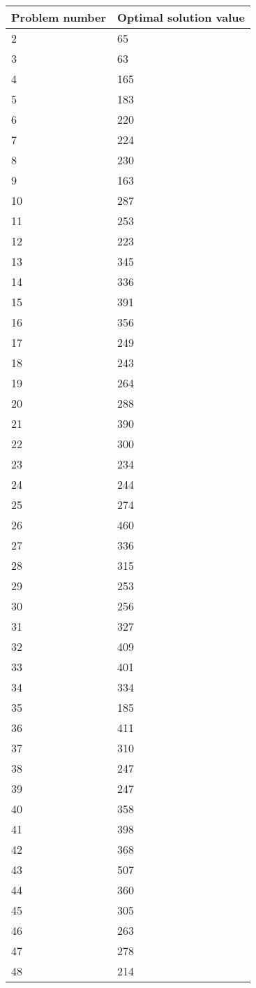 \begin{tabular}{*{2}{C{65pt}}}
	\toprule
	Problem number & Optimal solution value\\
	 & 65\\
	3 & 63\\
	4 & 165\\
	5 & 183\\
	6 & 220\\
	7 & 224\\
	8 & 230\\
	9 & 163\\
	10 & 287\\
	11 & 253\\
	12 & 223\\
	13 & 345\\
	14 & 336\\
	15 & 391\\
	16 & 356\\
	17 & 249\\
	18 & 243\\
	19 & 264\\
	20 & 288\\
	21 & 390\\
	22 & 300\\
	23 & 234\\
	24 & 244\\
	25 & 274\\
	26 & 460\\
	27 & 336\\
	28 & 315\\
	29 & 253\\
	30 & 256\\
	31 & 327\\
	32 & 409\\
	33 & 401\\
	34 & 334\\
	35 & 185\\
	36 & 411\\
	37 & 310\\
	38 & 247\\
	39 & 247\\
	40 & 358\\
	41 & 398\\
	42 & 368\\
	43 & 507\\
	44 & 360\\
	45 & 305\\
	46 & 263\\
	47 & 278\\
	48 & 214\\

\end{tabular}
